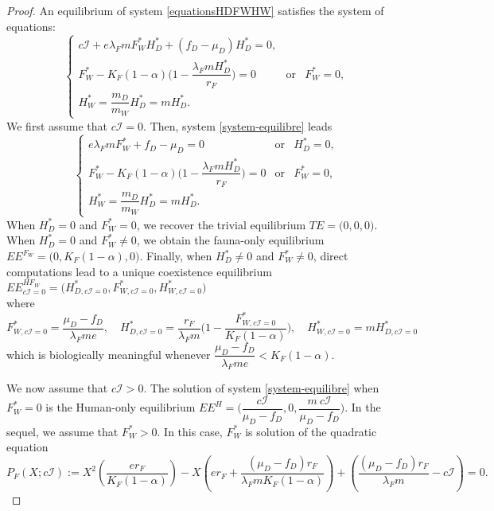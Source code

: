 \documentclass{article}
\newcommand{\lfw}{\lambda_{F}}
\newcommand{\lfw}{\lambda_{F}}
\begin{document}
\begin{proof}
An equilibrium of system \eqref{equationsHDFWHW} satisfies the system of equations:
\begin{equation}\label{system-equilibre}
\left\lbrace \begin{array}{cll}
c\mathcal{I} + e \lfw m F_W^* H_D^* + (f_D - \mu_D) H_D^* = 0,&&\\
F_W^* - K_F(1-\alpha) \Big(1 - \dfrac{\lfw m H^*_D}{r_F} \Big) = 0& \mbox{or} & F^*_W = 0,\\
H_W^* = \dfrac{m_D}{m_W} H_D^* = m H_D^*.&&
\end{array} \right.
\end{equation}
We first assume that $c\mathcal{I}=0$. Then, system \eqref{system-equilibre} leads 
\begin{equation}\label{system-equilibre2}
\left\lbrace \begin{array}{cll}
 e \lfw m F_W^* + f_D - \mu_D = 0& \mbox{or} & H_D^* = 0,\\
F_W^* - K_F(1-\alpha) \Big(1 - \dfrac{\lfw m H^*_D}{r_F} \Big) = 0& \mbox{or} & F^*_W = 0,\\
H_W^* = \dfrac{m_D}{m_W} H_D^* = m H_D^*.&&
\end{array} \right.
\end{equation}
When $H_D^*=0$ and $F_W^*=0$, we recover the trivial equilibrium $TE = \Big(0,0,0\Big)$. When $H_D^*=0$ and $F_W^*\neq0$, we obtain the fauna-only equilibrium $EE^{F_W} = \Big(0, K_F(1-\alpha), 0 \Big)$. Finally, when $H_D^*\neq0$ and $F_W^*\neq0$, direct computations lead to a unique coexistence equilibrium 
$EE^{HF_W}_{c\mathcal{I} = 0} = \Big(H^*_{D, c\mathcal{I} = 0}, F^*_{W, c\mathcal{I} = 0}, H^*_{W, c\mathcal{I} = 0} \Big)$ \\ 
where 
$$
F^*_{W, c\mathcal{I} = 0} = \dfrac{\mu_D - f_D}{\lfw m e},
\quad
H^*_{D, c\mathcal{I} = 0} = \dfrac{r_F}{\lfw m} \Big(1 - \dfrac{F^*_{W, c\mathcal{I} = 0}}{K_F(1-\alpha)} \Big),
\quad
H^*_{W, c\mathcal{I} = 0} = m H^*_{D, c\mathcal{I} = 0}
$$
which is biologically meaningful whenever $\dfrac{\mu_D - f_D}{\lfw m e} < K_F(1-\alpha).$


\bigskip
We now assume that $c\mathcal{I}>0$. The solution of system \eqref{system-equilibre} when $F_W^* = 0$ is the Human-only equilibrium $EE^{H} = \Big(\dfrac{c\mathcal{I}}{\mu_D - f_D}, 0, \dfrac{m \ c\mathcal{I}}{\mu_D - f_D} \Big)$.
In the sequel, we assume that $F_W^* > 0$. In this case, $F^*_W$ is solution of the quadratic equation
\begin{equation}
P_F(X ; c\mathcal{I}) := X^2 \left(\dfrac{er_F}{K_F(1-\alpha)} \right) - X \left(er_F + \dfrac{(\mu_D - f_D) r_F}{\lfw m K_F(1-\alpha)} \right) + \left(\dfrac{(\mu_D - f_D) r_F}{\lfw m} - c\mathcal{I} \right) = 0.
\label{polynome-Feq}
\end{equation}


\end{proof}
\end{document}
